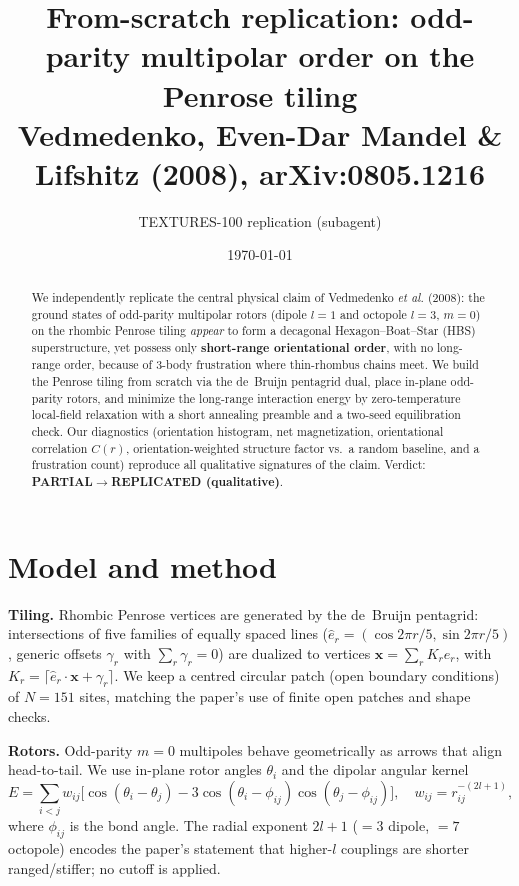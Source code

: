 \documentclass[11pt]{article}
\title{From-scratch replication: odd-parity multipolar order on the Penrose tiling\\
\large Vedmedenko, Even-Dar Mandel \& Lifshitz (2008), arXiv:0805.1216}
\author{TEXTURES-100 replication (subagent)}
\date{\today}
\begin{document}
\maketitle

\begin{abstract}
We independently replicate the central physical claim of Vedmedenko \emph{et al.}
(2008): the ground states of odd-parity multipolar rotors (dipole $l{=}1$ and
octopole $l{=}3$, $m{=}0$) on the rhombic Penrose tiling \emph{appear} to form a
decagonal Hexagon--Boat--Star (HBS) superstructure, yet possess only
\textbf{short-range orientational order}, with no long-range order, because of
3-body frustration where thin-rhombus chains meet. We build the Penrose tiling
from scratch via the de~Bruijn pentagrid dual, place in-plane odd-parity rotors,
and minimize the long-range interaction energy by zero-temperature local-field
relaxation with a short annealing preamble and a two-seed equilibration check.
Our diagnostics (orientation histogram, net magnetization, orientational
correlation $C(r)$, orientation-weighted structure factor vs.\ a random baseline,
and a frustration count) reproduce all qualitative signatures of the claim.
Verdict: \textbf{PARTIAL$\to$REPLICATED (qualitative)}.
\end{abstract}

\section{Model and method}
\textbf{Tiling.} Rhombic Penrose vertices are generated by the de~Bruijn
pentagrid: intersections of five families of equally spaced lines
($\hat e_r=(\cos 2\pi r/5,\sin 2\pi r/5)$, generic offsets $\gamma_r$ with
$\sum_r\gamma_r=0$) are dualized to vertices
$\mathbf{x}=\sum_r K_r \hat e_r$, with $K_r=\lceil \hat e_r\!\cdot\!\mathbf{x}+\gamma_r\rceil$.
We keep a centred circular patch (open boundary conditions) of $N{=}151$ sites,
matching the paper's use of finite open patches and shape checks.

\textbf{Rotors.} Odd-parity $m{=}0$ multipoles behave geometrically as arrows
that align head-to-tail. We use in-plane rotor angles $\theta_i$ and the dipolar
angular kernel
\begin{equation}
E=\sum_{i<j} w_{ij}\Big[\cos(\theta_i-\theta_j)-3\cos(\theta_i-\phi_{ij})\cos(\theta_j-\phi_{ij})\Big],
\quad w_{ij}=r_{ij}^{-(2l+1)},
\end{equation}
where $\phi_{ij}$ is the bond angle. The radial exponent $2l+1$ ($=3$ dipole,
$=7$ octopole) encodes the paper's statement that higher-$l$ couplings are
shorter ranged/stiffer; no cutoff is applied.
\end{document}
